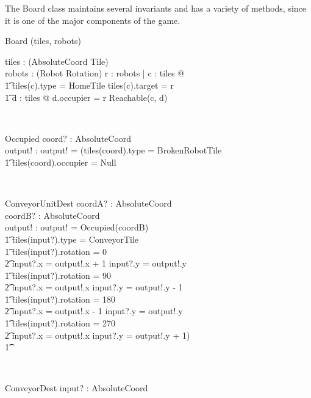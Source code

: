 \documentclass[12pt]{article}
\begin{document}
The Board class maintains several invariants and has a variety of methods, since it is one of the major components of the game.

\begin{class}{Board}
\upharpoonright (tiles, robots) \\
\begin{state}
tiles : \power (AbsoluteCoord \fun Tile) \\
robots : \power (Robot \fun Rotation)
\where
\forall r : robots | \exists c : \dom tiles @  \\ \t1 tiles(c).type = HomeTile \wedge tiles(c).target = r \wedge \\ \t1
\exists d : \dom tiles @ d.occupier = r \wedge Reachable(c, d)
\end{state} \\
\begin{schema}{Occupied}
coord? : AbsoluteCoord \\
output! : \bool
\where
output! = (tiles(coord).type = BrokenRobotTile \; \; \vee \\ \t1
tiles(coord).occupier \not = Null
\end{schema} \\
\begin{schema}{ConveyorUnitDest}
coordA? : AbsoluteCoord \\
coordB? : AbsoluteCoord \\
output! : \bool
\where
output! = \neg Occupied(coordB) \\ \t1
        tiles(input?).type = ConveyorTile \\ \t1
        tiles(input?).rotation = 0 \Rightarrow \\ \t2 input?.x = output!.x + 1 \wedge input?.y = output!.y \\ \t1
        tiles(input?).rotation = 90 \Rightarrow \\ \t2 input?.x = output!.x \wedge input?.y = output!.y - 1 \\ \t1
        tiles(input?).rotation = 180 \Rightarrow \\ \t2 input?.x = output!.x - 1 \wedge input?.y = output!.y \\ \t1
        tiles(input?).rotation = 270 \Rightarrow \\ \t2 input?.x = output!.x \wedge input?.y = output!.y + 1) \\ \t1
\end{schema} \\
\znewpage
\begin{schema}{ConveyorDest}
input? : AbsoluteCoord \\

\end{schema}
\end{class}
\end{document}
